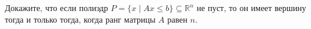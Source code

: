 Докажите, что если полиэдр $P = \{x \mid Ax \le b\} \subseteq \mathbb{R}^n$ не пуст, то он имеет вершину тогда и только
тогда, когда ранг матрицы $A$ равен $n$.